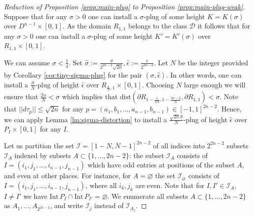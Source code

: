 \documentclass[12pt]{amsart}
\theoremstyle{plain}
\theoremstyle{definition}
\theoremstyle{remark}
\newcommand{\D}{\mathcal{D}}
\newcommand{\I}{\mathcal{I}}
\newcommand{\eps}{\epsilon}
\newcommand{\p}{\partial}
\newcommand{\wh}{\widehat}
\newcommand{\Int}{\mathrm{Int\,}}
\newcommand{\dist}{\mathrm{dist}}
\begin{document}
  
 \begin{proof}[Reduction of  Proposition \ref{prop:main-plug} to Proposition \ref{prop:main-plug-weak}]
 Suppose  that for any $\sigma>0$ one  can install a $\sigma$-plug of some height $K=K(\sigma)$ over $D^{n-1}\times[0,1]$. 
As the domain $R_{1,1}$ belongs to the class $\D$ it follows  that  for any $\sigma>0$ one  can install a $\sigma$-plug of some height $K'=K'(\sigma)$ over $R_{1,1}\times[0,1]$. 

 We can assume $\sigma<\frac14.$
 Set $\wh\sigma:=\frac\sigma{2^{2n-2}\sqrt{2n}}, \wh\eps:=\frac{\eps}{2^{2n-2}}$. 
 Let $N$ be the integer  provided by  Corollary \ref{cor:tiny-sigma-plug} for the pair $(\wh\sigma,\wh\eps)$. 
 In other words,  one can install a $\frac{\wh\sigma}N$-plug of height $\wh\eps$ over  $R_{\frac1{N},1}\times[0,1]$.
Choosing $N$ large enough we will ensure that $\frac{2n}N< \sigma$ which implies that $\dist(\p R_{1-\frac1{3N},1-\frac{2n-2}N}, \p R_{1,1})<\sigma$.
 Note that  $||d\tau_p||\leq \sqrt{2n}$ for any $p=(a_1,b_1,\dots, a_{n-1}, b_{n-1})\in[-1,1]^{2n-2}$.  Hence, we can apply
 Lemma \ref{lm:sigma-distortion} to install a  $\frac{\sqrt{2n}\wh\sigma}N$-plug of height $\wh\eps$ over $P_I\times[0,1]$ for any $I$. 

 Let us partition  the set  $\I=[1-N,N-1]^{2n-2}$ of all indices into $2^{2n-2}$ subsets $\I_A$ indexed by subsets $A\subset\{1,\dots, 2n-2\}$: the subset $\I_A$ consists of  $I=(i_1,j_1,\dots, i_{n-1}, j_{n-1})$ which have    odd entries  at positions of the subset $A$, and even at other places.  For instance, for $A=\varnothing$ the set $\I_{\varnothing}$ consists of  $I=(i_1,j_1,\dots, i_{n-1}, j_{n-1})$, where all $i_k, j_k$ are even.  Note that for $I,I'\in \I_A$, $I\neq I'$ we have $\Int P_I\cap \Int P_{I'}=\varnothing$. We  enumerate all  subsets $A\subset\{1,\dots, 2n-2\}$  as $A_1,\dots, A_{2^{2n-2}}$, and write $\I_j$ instead of $\I_{A_j}$. 


\end{proof}
\end{document}
